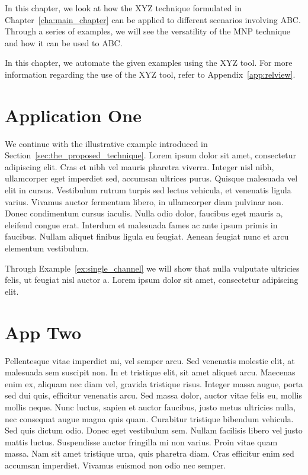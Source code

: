 In this chapter, we look at how the XYZ technique formulated in Chapter~\ref{cha:main_chapter} can be applied to different scenarios involving ABC. Through a series of examples, we will see the versatility of the MNP technique and how it can be used to ABC. \newline

In this chapter, we automate the given examples using the XYZ tool. For more information regarding the use of the XYZ tool, refer to Appendix~\ref{app:relview}.


\section{Application One}
\label{sec:app_one}

We continue with the illustrative example introduced in Section~\ref{sec:the_proposed_technique}. Lorem ipsum dolor sit amet, consectetur adipiscing elit. Cras et nibh vel mauris pharetra viverra. Integer nisl nibh, ullamcorper eget imperdiet sed, accumsan ultrices purus. Quisque malesuada vel elit in cursus. Vestibulum rutrum turpis sed lectus vehicula, et venenatis ligula varius. Vivamus auctor fermentum libero, in ullamcorper diam pulvinar non. Donec condimentum cursus iaculis. Nulla odio dolor, faucibus eget mauris a, eleifend congue erat. Interdum et malesuada fames ac ante ipsum primis in faucibus. Nullam aliquet finibus ligula eu feugiat. Aenean feugiat nunc et arcu elementum vestibulum. \newline  

Through Example~\ref{ex:single_channel} we will show that nulla vulputate ultricies felis, ut feugiat nisl auctor a. Lorem ipsum dolor sit amet, consectetur adipiscing elit. \newline




\section{App Two}
\label{sec:app_two}

Pellentesque vitae imperdiet mi, vel semper arcu. Sed venenatis molestie elit, at malesuada sem suscipit non. In et tristique elit, sit amet aliquet arcu. Maecenas enim ex, aliquam nec diam vel, gravida tristique risus. Integer massa augue, porta sed dui quis, efficitur venenatis arcu. Sed massa dolor, auctor vitae felis eu, mollis mollis neque. Nunc luctus, sapien et auctor faucibus, justo metus ultricies nulla, nec consequat augue magna quis quam. Curabitur tristique bibendum vehicula. Sed quis dictum odio. Donec eget vestibulum sem. Nullam facilisis libero vel justo mattis luctus. Suspendisse auctor fringilla mi non varius. Proin vitae quam massa. Nam sit amet tristique urna, quis pharetra diam. Cras efficitur enim sed accumsan imperdiet. Vivamus euismod non odio nec semper. \newline


